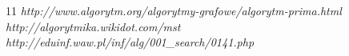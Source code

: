 


%
%


\setcounter{secnumdepth}{-1}
\begin {thebibliography}{11}
 \emph{http://www.algorytm.org/algorytmy-grafowe/algorytm-prima.html}
\emph{http://algorytmika.wikidot.com/mst}
\emph{http://eduinf.waw.pl/inf/alg/001\_search/0141.php}
\end {thebibliography}
\listoffigures
{}
